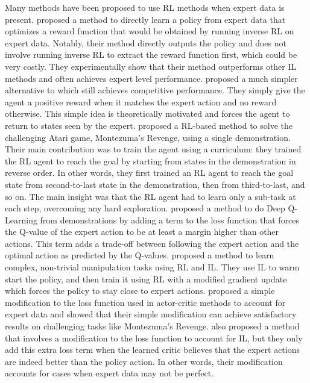 \documentclass[11pt,a4paper]{article}
\begin{document}
Many methods have been proposed to use RL methods when expert data is present. \cite{ho2016generative} proposed a method to directly learn a policy from expert data that optimizes a reward function that would be obtained by running inverse RL \cite{abbeel2010inverse} on expert data. Notably, their method directly outputs the policy and does not involve running inverse RL to extract the reward function first, which could be very costly. They experimentally show that their method outperforms other IL methods and often achieves expert level performance. \cite{reddy2019sqil} proposed a much simpler alternative to \cite{ho2016generative} which still achieves competitive performance. They simply give the agent a positive reward when it matches the expert action and no reward otherwise. This simple idea is theoretically motivated and forces the agent to return to states seen by the expert. \cite{salimans2018learning} proposed a RL-based method to solve the challenging Atari game, Montezuma's Revenge, using a single demonstration. Their main contribution was to train the agent using a curriculum: they trained the RL agent to reach the goal by starting from states in the demonstration in reverse order. In other words, they first trained an RL agent to reach the goal state from second-to-last state in the demonstration, then from third-to-last, and so on. The main insight was that the RL agent had to learn only a sub-task at each step, overcoming any hard exploration. \cite{hester2018deep} proposed a method to do Deep Q-Learning \cite{mnih2013playing} from demonstrations by adding a term to the loss function that forces the Q-value of the expert action to be at least a margin higher than other actions. This term adds a trade-off between following the expert action and the optimal action as predicted by the Q-values. \cite{rajeswaran2017learning} proposed a method to learn complex, non-trivial manipulation tasks using RL and IL. They use IL to warm start the policy, and then train it using RL with a modified gradient update which forces the policy to stay close to expert actions. \cite{garmulewicz2018expert} proposed a simple modification to the loss function used in actor-critic methods to account for expert data and showed that their simple modification can achieve satisfactory results on challenging tasks like Montezuma's Revenge. \cite{nair2018overcoming} also proposed a method that involves a modification to the loss function to account for IL, but they only add this extra loss term when the learned critic believes that the expert actions are indeed better than the policy action. In other words, their modification accounts for cases when expert data may not be perfect.
\end{document}
